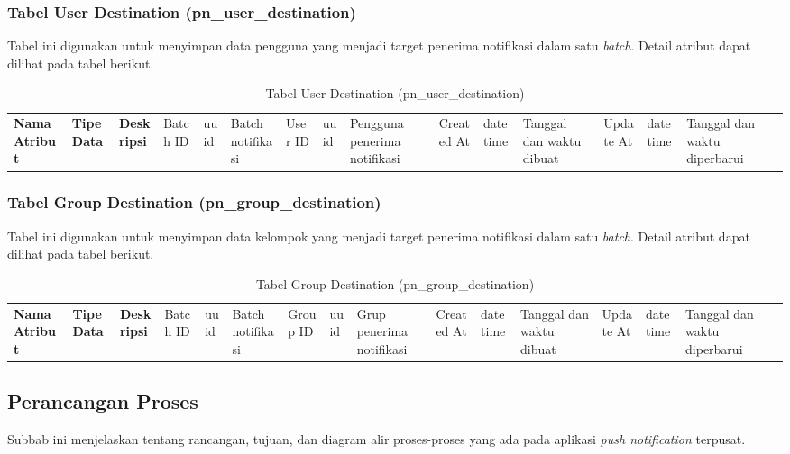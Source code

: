 \subsubsection{Tabel User Destination (pn\_user\_destination)}
\par Tabel ini digunakan untuk menyimpan data pengguna yang menjadi target penerima notifikasi dalam satu \textit{batch}. Detail atribut dapat dilihat pada tabel berikut.
\begin{longtable}{|p{2.5cm}|p{2cm}|p{4.5cm}|}
    \hline
    \textbf{Nama Atribut} & \textbf{Tipe Data} & \textbf{Deskripsi} & \hline
    Batch ID & uuid & Batch notifikasi & \hline
    User ID & uuid & Pengguna penerima notifikasi & \hline
    Created At & datetime & Tanggal dan waktu dibuat & \hline
    Update At & datetime & Tanggal dan waktu diperbarui & \hline
    \caption{Tabel User Destination (pn\_user\_destination)}
\end{longtable}

\subsubsection{Tabel Group Destination (pn\_group\_destination)}
\par Tabel ini digunakan untuk menyimpan data kelompok yang menjadi target penerima notifikasi dalam satu \textit{batch}. Detail atribut dapat dilihat pada tabel berikut.
\begin{longtable}{|p{2.5cm}|p{2cm}|p{4.5cm}|}
    \hline
    \textbf{Nama Atribut} & \textbf{Tipe Data} & \textbf{Deskripsi} & \hline
    Batch ID & uuid & Batch notifikasi & \hline
    Group ID & uuid & Grup penerima notifikasi & \hline
    Created At & datetime & Tanggal dan waktu dibuat & \hline
    Update At & datetime & Tanggal dan waktu diperbarui & \hline
    \caption{Tabel Group Destination (pn\_group\_destination)}
\end{longtable}

\subsection{Perancangan Proses}
\par Subbab ini menjelaskan tentang rancangan, tujuan, dan diagram alir proses-proses yang ada pada aplikasi
\textit{push notification} terpusat.

